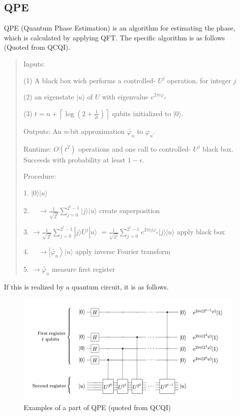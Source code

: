 \documentclass[b5paper,papersize,dvipdfmx,fleqn]{jsarticle}
\begin{document}
\subsection{QPE}
QPE (Quantum Phase Estimation) is an algorithm for estimating the phase, which is calculated by applying QFT. The specific algorithm is as follows (Quoted from QCQI).
\begin{quotation}

  Inputs:

   (1) A black box wich performs a controlled- $U^{j}$ operation, for integer $j$

   (2) an eigenstate $|u\rangle$ of $U$ with eigenvalue $e^{2 \pi i \varphi_{u}}$

   (3) $t=n+\left\lceil\log \left(2+\frac{1}{2 \epsilon}\right)\right\rceil$ qubits initialized to $|0\rangle$.


  Outputs: An $n$-bit approximation $\widetilde{\varphi_{u}}$ to $\varphi_{u} .$


  Runtime: $O\left(t^{2}\right)$ operations and one call to controlled- $U^{j}$ black box. Succeeds with probability at least $1-\epsilon$.


  Procedure:


  1. $|0\rangle|u\rangle$


  2. $\quad \rightarrow \frac{1}{\sqrt{2^{t}}} \sum_{j=0}^{2^{t}-1}|j\rangle|u\rangle$ create superposition


  3. $\rightarrow \frac{1}{\sqrt{2^{t}}} \sum_{j=0}^{2^{t}-1}|j\rangle U^{j}|u\rangle$ $=\frac{1}{\sqrt{2^{t}}} \sum_{j=0}^{2^{t}-1} e^{2 \pi i j \varphi_{u}}|j\rangle|u\rangle$ apply black box


  4. $\quad \rightarrow\left|\widetilde{\varphi_{u}}\right\rangle|u\rangle$ apply inverse Fourier transform


  5. $\rightarrow \widetilde{\varphi_{u}}$ measure first register
\end{quotation}


If this is realized by a quantum circuit, it is as follows.
\begin{center}
  \begin{figure}[H]
       \includegraphics[width=\textwidth]{qpe.pdf}
       \caption{Examples of a part of QPE (quoted from QCQI)}
       \label{circuit}
  \end{figure}
\end{center}
\end{document}
